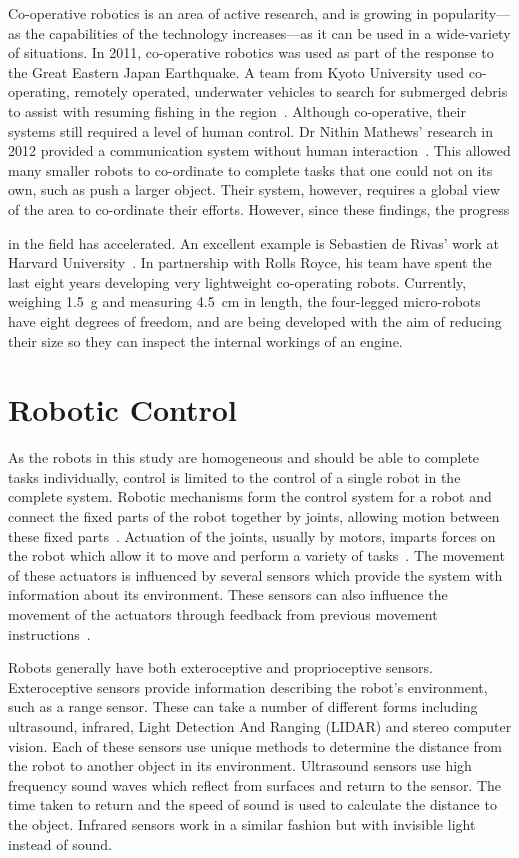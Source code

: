 Co-operative robotics is an area of active research, and is growing in popularity---as the
capabilities of the technology increases---as it can be used in a wide-variety of
situations. In 2011, co-operative robotics was used as part of the
response to the Great Eastern Japan Earthquake. A team from Kyoto University
used co-operating, remotely operated, underwater vehicles to search for submerged
debris to assist with resuming fishing in the region~\cite{matsuno2014utilization}.
Although co-operative, their systems still required a level of human control.
Dr Nithin Mathews' research in 2012 provided a communication system without
human interaction~\cite{mathews2012spatially}. This allowed many smaller robots
to co-ordinate to complete tasks that one could not on its own, such as push a
larger object. Their system, however, requires a global view of the area to
co-ordinate their efforts. However, since these findings, the progress

in the field has accelerated. An excellent example is Sebastien de Rivas' work at
Harvard University~\cite{rollsroyceSWARM}. In partnership with Rolls Royce, his
team have spent the last eight years developing very lightweight co-operating robots.
Currently, weighing \SI{1.5}{\g} and measuring \SI{4.5}{\cm} in length, the
four-legged micro-robots have eight degrees of freedom, and are being developed with
the aim of reducing their size so they can inspect the internal workings of an engine.

\section{Robotic Control} \label{litreview/robotics/control}  
As the robots in this study are homogeneous and should be able to complete 
tasks individually, control is limited to the control of a single robot in the 
complete system. Robotic mechanisms form the control system for a robot and 
connect the fixed parts of the robot together by joints, allowing motion between 
these fixed parts~\cite{lynch2017modern}. Actuation of the joints, usually 
by motors, imparts forces on the robot which allow it to move and perform a 
variety of tasks~\cite{lynch2017modern}. The movement of these actuators 
is influenced by several sensors which provide the system with information 
about its environment. These sensors can also influence the movement of the 
actuators through feedback from previous movement instructions~\cite{lynch2017modern}.    

Robots generally have both exteroceptive and proprioceptive sensors. Exteroceptive sensors provide information describing the robot's environment, such as a range sensor. These can take a number of different forms 
including ultrasound, infrared, Light Detection And Ranging (LIDAR) and 
stereo computer vision. Each of these sensors use unique methods to determine 
the distance from the robot to another object in its environment. Ultrasound 
sensors use high frequency sound waves which reflect from surfaces and return 
to the sensor. The time taken to return and the speed of sound is used to 
calculate the distance to the object. Infrared sensors work in a similar 
fashion but with invisible light instead of sound. 

